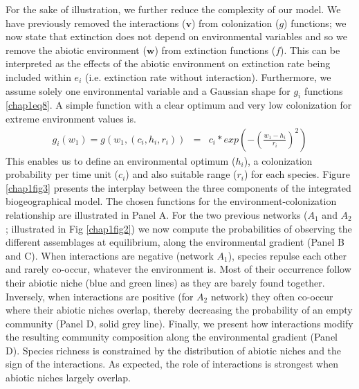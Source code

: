 For the sake of illustration, we further reduce the complexity of our model. We have previously removed the interactions ($\mathbf{v}$) from colonization ($g$) functions; we now state that extinction does not depend on environmental variables and so we remove the abiotic environment ($\mathbf{w}$) from extinction functions ($f$). This can be interpreted as the effects of the abiotic environment on extinction rate being included within $e_i$ (i.e. extinction rate without interaction). Furthermore, we assume solely one environmental variable and a Gaussian shape for $g_i$ functions \eqref{chap1eq8}. A simple function with a clear optimum and very low colonization for extreme environment values is.
\begin{eqnarray}
\label{chap1eq8} g_i(w_1)=g(w_1,(c_i,h_i,r_i))&=&c_i*exp\left(- \left( \frac{w_1-h_i}{r_i} \right) ^2\right)
\end{eqnarray}
This enables us to define an environmental optimum ($h_i$), a colonization probability per time unit ($c_i$) and also suitable range ($r_i$) for each species. Figure \ref{chap1fig3} presents the interplay between the three components of the integrated biogeographical model. The chosen functions for the environment-colonization relationship are illustrated in Panel A. For the two previous networks ($A_1$ and $ A_2$; illustrated in Fig \ref{chap1fig2}) we now compute the probabilities of observing the different assemblages at equilibrium, along the environmental gradient (Panel B and C). When interactions are negative (network $A_1$), species repulse each other and rarely co-occur, whatever the environment is. Most of their occurrence follow their abiotic niche (blue and green lines) as they are barely found together. Inversely, when interactions are positive (for $A_2$ network) they often co-occur where their abiotic niches overlap, thereby decreasing the probability of an empty community (Panel D, solid grey line). Finally, we present how interactions modify the resulting community composition along the environmental gradient (Panel D). Species richness is constrained by the distribution of abiotic niches and the sign of the interactions. As expected, the role of interactions is strongest when abiotic niches largely overlap.

